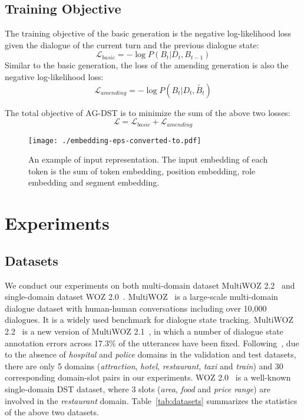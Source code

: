 \documentclass[11pt]{article}
\begin{document}
\subsection{Training Objective}

The training objective of the basic generation is the negative log-likelihood loss given the dialogue of the current turn and the previous dialogue state:
\begin{equation}
    \mathcal{L}_{basic}=-\log P(B_t|D_t,B_{t-1})
\end{equation}
Similar to the basic generation, the loss of the amending generation is also the negative log-likelihood loss:
\begin{equation}
    \mathcal{L}_{amending}=-\log P(B_t|D_t,\tilde{B_{t}})
\end{equation}

The total objective of AG-DST is to minimize the sum of the above two losses:
\begin{equation}
    \mathcal{L}=\mathcal{L}_{basic}+\mathcal{L}_{amending}
\end{equation}

\begin{figure*}
	\centering
	\texttt{[image: ./embedding-eps-converted-to.pdf]}
	\caption{An example of input representation. The input embedding of each token is the sum of token embedding, position embedding, role embedding and segment embedding.}
	\label{fig:embedding}
\end{figure*}

\section{Experiments}

\subsection{Datasets}

We conduct our experiments on both multi-domain dataset MultiWOZ 2.2~\citep{zang-etal-2020-multiwoz} and single-domain dataset WOZ 2.0~\citep{wen-etal-2017-network}. MultiWOZ~\citep{budzianowski-etal-2018-multiwoz} is a large-scale multi-domain dialogue dataset with human-human conversations including over 10,000 dialogues. It is a widely used benchmark for dialogue state tracking. MultiWOZ 2.2~\citep{zang-etal-2020-multiwoz} is a new version of MultiWOZ 2.1~\citep{eric2019multiwoz}, in which a number of dialogue state annotation errors across 17.3\% of the utterances have been fixed. 
Following~\citet{wu-etal-2019-transferable}, due to the absence of \textit{hospital} and \textit{police} domains in the validation and test datasets, there are only 5 domains (\textit{attraction}, \textit{hotel}, \textit{restaurant}, \textit{taxi} and \textit{train}) and 30 corresponding domain-slot pairs in our experiments. WOZ 2.0~\citep{wen-etal-2017-network} is a well-known single-domain DST dataset, where 3 slots (\textit{area}, \textit{food} and \textit{price range}) are involved in the \textit{restaurant} domain. Table~\ref{tab:datasets} summarizes the statistics of the above two datasets.
\end{document}
